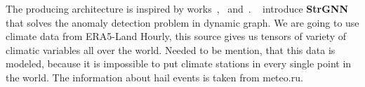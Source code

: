 \documentclass{article}
\begin{document}
%
%
%

The producing architecture is inspired by  works~\cite{DBLP:journals/corr/abs-2012-01598},~\cite{wu2020connecting} and~\cite{DBLP:journals/corr/abs-2005-07427}. ~\cite{DBLP:journals/corr/abs-2005-07427} introduce \textbf{StrGNN} that solves the anomaly detection problem in dynamic graph. We are going to use climate data from ERA5-Land Hourly, this source gives us tensors of variety of climatic variables all over the world. Needed to be mention, that this data is modeled, because it is impossible to put climate stations in every single point in the world. The information about hail events is taken from meteo.ru.
\newpage
\end{document}
